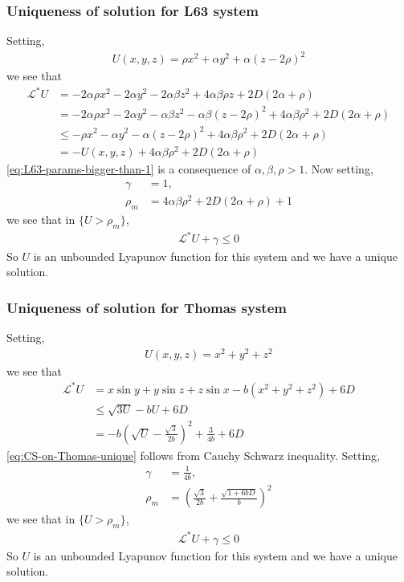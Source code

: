 \subsubsection{Uniqueness of solution for L63 system}\label{sssec-L63-unique}
Setting,
\begin{align}
U(x, y, z) = \rho x^2 +\alpha y^2 + \alpha(z-2\rho)^2
\end{align}
we see that
\begin{align}
    \mathcal L^*U &= -2\alpha\rho x^2 - 2\alpha y^2 -2\alpha\beta z^2 + 4\alpha\beta\rho z + 2D(2\alpha+\rho)\\
    &=-2\alpha\rho x^2 - 2\alpha y^2 -\alpha\beta z^2 -\alpha\beta(z-2\rho)^2 + 4\alpha\beta\rho^2 + 2D(2\alpha+\rho)\\
    &\le -\rho x^2 -\alpha y^2 -\alpha(z-2\rho)^2 + 4\alpha\beta\rho^2 + 2D(2\alpha+\rho)\label{eq:L63-params-bigger-than-1}\\
    &= -U(x, y, z)+ 4\alpha\beta\rho^2 + 2D(2\alpha+\rho)
\end{align}
\eqref{eq:L63-params-bigger-than-1} is a consequence of $\alpha, \beta, \rho>1$. Now setting,
\begin{align}
    \gamma &= 1,\\
    \rho_m &= 4\alpha\beta\rho^2 + 2D(2\alpha+\rho)+1
\end{align} we see that in $\{U>\rho_m\}$,
\begin{align}
    \mathcal L^*U +\gamma \le 0
\end{align}
So $U$ is an unbounded Lyapunov function for this system and we have a unique solution.
\subsubsection{Uniqueness of solution for Thomas system}\label{sssec-Thomas-unique}
Setting,
\begin{align}
    U(x, y, z) = x^2+y^2+z^2
\end{align}
we see that
\begin{align}
    \mathcal L^* U &= x\sin y + y\sin z + z\sin x - b(x^2+y^2+z^2) + 6D\\
    &\le \sqrt{3U}-bU + 6D\label{eq:CS-on-Thomas-unique}\\
    &= -b\left(\sqrt{U}-\frac{\sqrt{3}}{2b}\right)^2 +\frac{3}{4b}+6D
\end{align}
\eqref{eq:CS-on-Thomas-unique} follows from Cauchy Schwarz inequality. Setting,
\begin{align}
    \gamma &= \frac{1}{4b},\\
    \rho_m &= \left(\frac{\sqrt{3}}{2b}+\frac{\sqrt{1+6bD}}{b}\right)^2
\end{align}
we see that in $\{U>\rho_m\}$,
\begin{align}
    \mathcal L^*U +\gamma \le 0
\end{align}
So $U$ is an unbounded Lyapunov function for this system and we have a unique solution.

